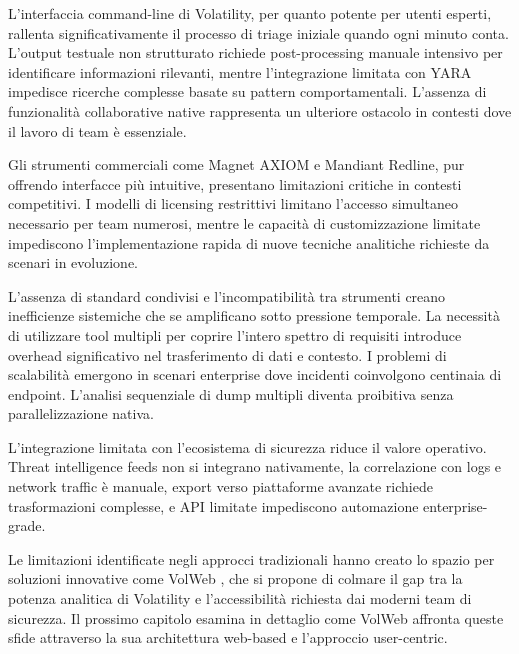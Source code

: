 L'interfaccia command-line di Volatility, per quanto potente per utenti esperti, rallenta significativamente il processo di triage iniziale quando ogni minuto conta. L'output testuale non strutturato richiede post-processing manuale intensivo per identificare informazioni rilevanti, mentre l'integrazione limitata con YARA impedisce ricerche complesse basate su pattern comportamentali. L'assenza di funzionalità collaborative native rappresenta un ulteriore ostacolo in contesti dove il lavoro di team è essenziale.

Gli strumenti commerciali come Magnet AXIOM e Mandiant Redline, pur offrendo interfacce più intuitive, presentano limitazioni critiche in contesti competitivi. I modelli di licensing restrittivi limitano l'accesso simultaneo necessario per team numerosi, mentre le capacità di customizzazione limitate impediscono l'implementazione rapida di nuove tecniche analitiche richieste da scenari in evoluzione.

L'assenza di standard condivisi e l'incompatibilità tra strumenti creano inefficienze sistemiche che se amplificano sotto pressione temporale. La necessità di utilizzare tool multipli per coprire l'intero spettro di requisiti introduce overhead significativo nel trasferimento di dati e contesto. I problemi di scalabilità emergono in scenari enterprise dove incidenti coinvolgono centinaia di endpoint. L'analisi sequenziale di dump multipli diventa proibitiva senza parallelizzazione nativa.

L'integrazione limitata con l'ecosistema di sicurezza riduce il valore operativo. Threat intelligence feeds non si integrano nativamente, la correlazione con logs e network traffic è manuale, export verso piattaforme avanzate richiede trasformazioni complesse, e API limitate impediscono automazione enterprise-grade.

Le limitazioni identificate negli approcci tradizionali hanno creato lo spazio per soluzioni innovative come VolWeb \cite{volweb2024}, che si propone di colmare il gap tra la potenza analitica di Volatility e l'accessibilità richiesta dai moderni team di sicurezza. Il prossimo capitolo esamina in dettaglio come VolWeb affronta queste sfide attraverso la sua architettura web-based e l'approccio user-centric.